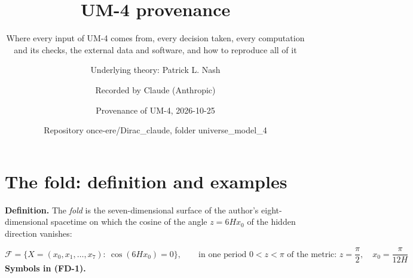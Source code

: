 \documentclass[
  10pt,
]{article}
\title{UM-4 provenance}
\subtitle{Where every input of UM-4 comes from, every decision taken,
every computation and its checks, the external data and software, and
how to reproduce all of it}
\author{Underlying theory: Patrick L. Nash \and Recorded by Claude
(Anthropic) \and Provenance of UM-4, 2026-10-25 \and Repository
once-ere/Dirac\_claude, folder universe\_model\_4}
\date{}
\begin{document}
\maketitle

{
\hypersetup{linkcolor=}
\setcounter{tocdepth}{3}
\tableofcontents
}
\hypertarget{the-fold-definition-and-examples}{%
\section{The fold: definition and
examples}\label{the-fold-definition-and-examples}}

\textbf{Definition.} The \emph{fold} is the seven-dimensional surface of
the author's eight-dimensional spacetime on which the cosine of the
angle \(z = 6Hx_0\) of the hidden direction vanishes:

\[
\mathcal{F} = \big\{X = (x_0, x_1, \dots, x_7):\ \cos(6Hx_0) = 0\big\},\qquad
\text{in one period } 0 < z < \pi\text{ of the metric: } z = \frac{\pi}{2},\quad x_0 = \frac{\pi}{12H} \tag{FD-1}
\] \textbf{Symbols in (FD-1).}
\end{document}
